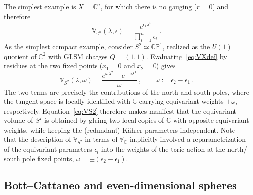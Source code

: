 \documentclass[11pt,a4paper]{article}
\theoremstyle{definition}
\theoremstyle{identity}
\theoremstyle{remark}
\newcommand{\be}{\begin{equation}}
\newcommand{\ee}{\end{equation}}
\newcommand{\BV}{\mathbb{V}}
\newcommand{\BC}{\mathbb{C}}
\begin{document}
The simplest example is $X=\BC^n$, for which there is no gauging ($r=0$) and therefore
\be
\label{eq:Cvol}
\BV_{\BC^n}(\lambda,\epsilon)
=
\frac{e^{\epsilon_i\lambda^i}}
{\prod_{i=1}^n\epsilon_i}\ .
\ee
As the simplest compact example, consider $S^2\simeq \mathbb{CP}^1$,
realized as the $U(1)$ quotient of $\BC^2$ with GLSM charges $Q=(1,1)$.
Evaluating~\eqref{eq:VXdef} by residues at the two fixed points
($x_1=0$ and $x_2=0$) gives
\be
\label{eq:VS2}
\BV_{S^2}(\lambda,\omega)
=
\frac{e^{\omega \lambda^2}-e^{-\omega\lambda^1}}
{\omega}\ ,
\qquad
\omega:=\epsilon_2-\epsilon_1\ .
\ee
The two terms are precisely the contributions of the north and south poles, where the tangent
space is locally identified with $\BC$ carrying equivariant weights $\pm\omega$, respectively.
Equation~\eqref{eq:VS2} therefore makes manifest that the equivariant volume of $S^2$ is obtained
by gluing two local copies of $\BC$ with opposite equivariant weights, while keeping the (redundant) K\"ahler
parameters independent. Note that the description of $\mathbb{V}_{S^2}$ in terms of $\mathbb{V}_\mathbb{C}$ implicitly involved a reparametrization of the equivariant parameters $\epsilon_i$ into the weights of the toric action at the north/ south pole fixed points, $\omega=\pm(\epsilon_2-\epsilon_1)$.%

\subsection{Bott--Cattaneo and even-dimensional spheres}
\label{subsec:even}
\end{document}
